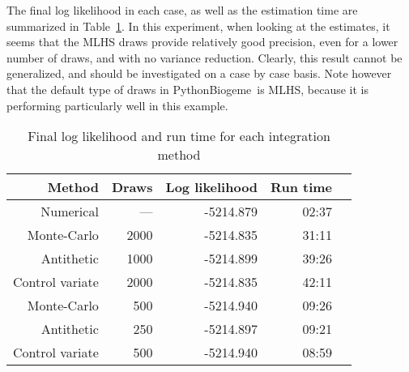 \documentclass[12pt,a4paper]{article}
\newcommand{\PBIOGEME}{PythonBiogeme}
\begin{document}
The final log likelihood in each case, as well as the estimation time
are summarized in Table~\ref{tab:estimSummary}. In this experiment,
when looking at the estimates, it
seems that the MLHS draws provide relatively good precision, even for a lower
number of draws, and with no variance reduction. Clearly, this result
cannot be generalized, and should be investigated on a case by case
basis. Note however that the default type of draws in \PBIOGEME\ is
MLHS, because it is performing particularly well in this example.

\begin{table}[htb]
\begin{center}
\begin{tabular}{rrrrr}
Method & Draws &  Log likelihood & Run time \\
\hline
Numerical & --- & -5214.879 & 02:37 \\
Monte-Carlo & 2000 & -5214.835 & 31:11 \\
Antithetic & 1000 & -5214.899 & 39:26 \\
Control variate & 2000 & -5214.835 & 42:11 \\
Monte-Carlo & 500 & -5214.940 & 09:26    \\
Antithetic & 250 & -5214.897 & 09:21 \\
Control variate & 500 & -5214.940 & 08:59 \\
\end{tabular}
\end{center}
\caption{\label{tab:estimSummary}Final log likelihood and run time for
each integration method}
\end{table}
\end{document}

